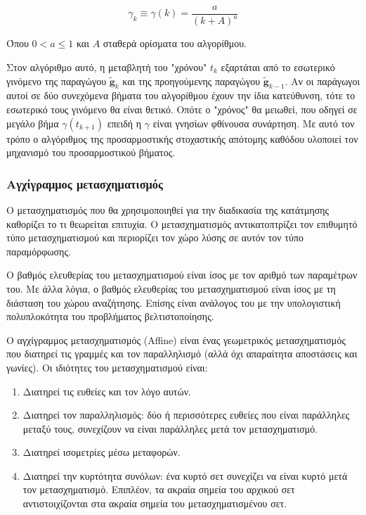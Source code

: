 \documentclass[a4paper,12pt]{article}
\begin{document}
\begin{equation*}
    \gamma_k \equiv \gamma(k) = \frac {a} {(k+A)^a}
\end{equation*}

Όπου $0 < a \leq 1$ και $A$ σταθερά ορίσματα του αλγορίθμου.

Στον αλγόριθμο αυτό, η μεταβλητή του "χρόνου" $t_k$ εξαρτάται από το εσωτερικό
γινόμενο της παραγώγου $\widetilde{\bm{g}}_{k}$ και της προηγούμενης παραγώγου
$\widetilde{\bm{g}}_{k-1}$. Αν οι παράγωγοι αυτοί σε δύο συνεχόμενα βήματα του
αλγορίθμου έχουν την ίδια κατεύθυνση, τότε  το εσωτερικό τους γινόμενο θα είναι
θετικό. Οπότε ο "χρόνος" θα μειωθεί, που οδηγεί σε μεγάλο βήμα
$\gamma(t_{k+1})$ επειδή η $\gamma$ είναι γνησίων φθίνουσα συνάρτηση. Με αυτό
τον τρόπο ο αλγόριθμος της προσαρμοστικής στοχαστικής απότομης καθόδου υλοποιεί
τον μηχανισμό του προσαρμοστικού βήματος.

\subsubsection{Αγχίγραμμος μετασχηματισμός} \label{reg:affine:1}

Ο μετασχηματισμός που θα χρησιμοποιηθεί για την διαδικασία της κατάτμησης
καθορίζει το τι θεωρείται επιτυχία. Ο μετασχηματισμός αντικατοπτρίζει τον
επιθυμητό τύπο μετασχηματισμού και περιορίζει τον χώρο λύσης σε αυτόν τον τύπο
παραμόρφωσης.

Ο βαθμός ελευθερίας του μετασχηματισμού είναι ίσος με τον αριθμό των παραμέτρων
του. Με άλλα λόγια, ο βαθμός ελευθερίας του μετασχηματισμού είναι ίσος με τη
διάσταση του χώρου αναζήτησης. Επίσης είναι ανάλογος του με την υπολογιστική
πολυπλοκότητα του προβλήματος βελτιστοποίησης.

Ο αγχίγραμμος μετασχηματισμός (Affine) είναι ένας γεωμετρικός μετασχηματισμός
που διατηρεί τις γραμμές και τον παραλληλισμό (αλλά όχι απαραίτητα αποστάσεις
και γωνίες). Οι ιδιότητες του μετασχηματισμού είναι:

\begin{enumerate}
    \item Διατηρεί τις ευθείες και τον λόγο αυτών.
    \item Διατηρεί τον παραλληλισμός: δύο ή περισσότερες ευθείες που είναι
        παράλληλες μεταξύ τους, συνεχίζουν να είναι παράλληλες μετά τον
        μετασχηματισμό.
    \item Διατηρεί ισομετρίες μέσω μεταφορών. 
    \item Διατηρεί την κυρτότητα συνόλων: ένα κυρτό σετ συνεχίζει να είναι κυρτό
        μετά τον μετασχηματισμό. Επιπλέον, τα ακραία σημεία του αρχικού σετ
        αντιστοιχίζονται στα ακραία σημεία του μετασχηματισμένου σετ.
\end{enumerate}
\end{document}
